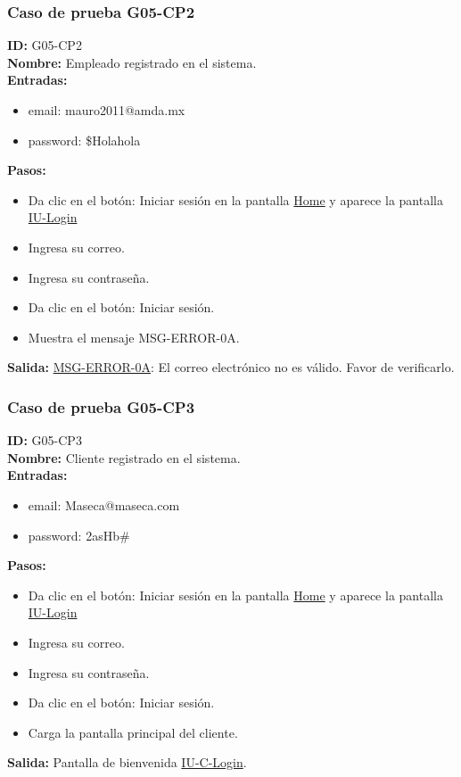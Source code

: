 \subsubsection{Caso de prueba G05-CP2}
\textbf{ID:} G05-CP2\\
\textbf{Nombre:} Empleado registrado en el sistema.\\
\textbf{Entradas:} 
\begin{itemize}
    \item email: mauro2011@amda.mx
    \item password: \$Holahola\\
\end{itemize}
\textbf{Pasos:}
\begin{itemize}
    \item Da clic en el botón: Iniciar sesión en la pantalla \hyperlink{IU:IU-HOME}{Home} y aparece la pantalla \hyperlink{IU:IU-Login}{IU-Login}
    \item Ingresa su correo.
    \item Ingresa su contraseña.
    \item Da clic en el botón: Iniciar sesión.
    \item Muestra el mensaje MSG-ERROR-0A.
\end{itemize}
\textbf{Salida:}
\hyperlink{MSG-ERROR-0A}{MSG-ERROR-0A}: El correo electrónico no es válido. Favor de verificarlo.

\subsubsection{Caso de prueba G05-CP3}
\textbf{ID:} G05-CP3\\
\textbf{Nombre:} Cliente registrado en el sistema.\\
\textbf{Entradas:} 
\begin{itemize}
    \item email: Maseca@maseca.com
    \item password: 2asHb\#\\
\end{itemize}
\textbf{Pasos:}
\begin{itemize}
    \item Da clic en el botón: Iniciar sesión en la pantalla \hyperlink{IU:IU-HOME}{Home} y aparece la pantalla \hyperlink{IU:IU-Login}{IU-Login}
    \item Ingresa su correo.
    \item Ingresa su contraseña.
    \item Da clic en el botón: Iniciar sesión.
    \item Carga la pantalla principal del cliente.
\end{itemize}
\textbf{Salida:}
Pantalla de bienvenida \hyperlink{IU:IU-C-Login}{IU-C-Login}.

